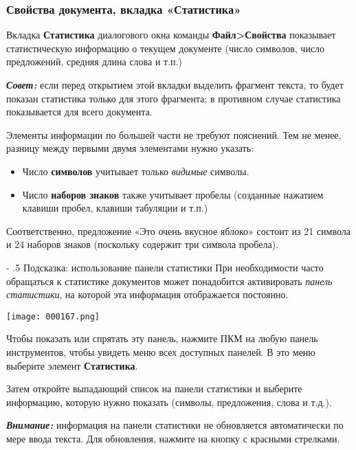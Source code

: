 ﻿\documentclass[a4paper,10pt]{article}
\makeatletter
\renewcommand\paragraph{%
   \@startsection{paragraph}{4}{0mm}%
      {-\baselineskip}%
      {.5\baselineskip}%
      {\normalfont\normalsize\bfseries}}
\makeatother
\begin{document}
 \subsubsection{Свойства документа, вкладка «Статистика»}
 Вкладка \textbf{Статистика} диалогового окна команды \textbf{Файл>Свойства} показывает статистическую информацию о текущем документе (число символов, число предложений, средняя длина слова и т.п.)
 
 \begin{mdframed}[backgroundcolor=blue!10]
\textbf{\textit{Совет:}} если перед открытием этой вкладки выделить фрагмент текста, то будет показан статистика только для этого фрагмента; в противном случае статистика показывается для всего документа.
\end{mdframed}
 
 Элементы информации по большей части не требуют пояснений. Тем не менее, разницу между первыми двумя элементами нужно указать:
 
 \begin{itemize}
  \item Число \textbf{символов} учитывает только \textit{видимые} символы.
  \item Число \textbf{наборов знаков} также учитывает пробелы (созданные нажатием клавиши пробел, клавиши табуляции и т.п.)
 \end{itemize}

 Соответственно, предложение «Это очень вкусное яблоко» состоит из 21 символа и 24 наборов знаков (поскольку содержит три символа пробела).
 
 \paragraph{Подсказка: использование панели статистики}
 При необходимости часто обращаться к статистике документов может понадобится активировать \textit{панель статистики}, на которой эта информация отображается постоянно.
 
 \texttt{[image: 000167.png]}
 
 Чтобы показать или спрятать эту панель, нажмите ПКМ на любую панель инструментов, чтобы увидеть меню всех доступных панелей. В это меню выберите элемент \textbf{Статистика}.
 
 Затем откройте выпадающий список на панели статистики и выберите информацию, которую нужно показать (символы, предложения, слова и т.д.).
 
 \begin{mdframed}[backgroundcolor=blue!10]
\textbf{\textit{Внимание:}} информация на панели статистики не обновляется автоматически по мере ввода текста. Для обновления, нажмите на кнопку с красными стрелками.
\end{mdframed}
  
\end{document}
